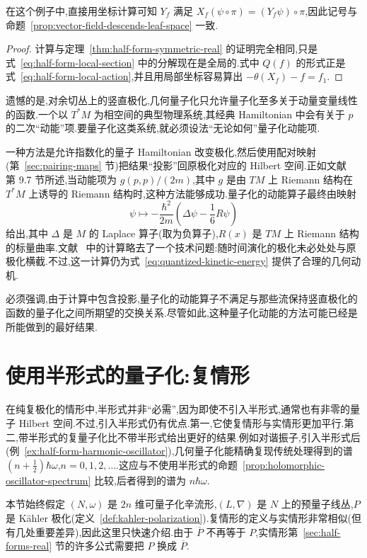 在这个例子中,直接用坐标计算可知 $Y_f$ 满足 $X_f(\psi\circ\pi)=(Y_f\psi)\circ\pi$,因此记号与命题~\ref{prop:vector-field-descends-leaf-space} 一致.

\begin{proof}
计算与定理~\ref{thm:half-form-symmetric-real} 的证明完全相同,只是式~\eqref{eq:half-form-local-section} 中的分解现在是全局的.式中 $Q(f)$ 的形式正是式~\eqref{eq:half-form-local-action},并且用局部坐标容易算出 $-\theta(X_f)-f=f_1$.
\end{proof}

遗憾的是,对余切丛上的竖直极化,几何量子化只允许量子化至多关于动量变量线性的函数.一个以 $T^*M$ 为相空间的典型物理系统,其经典 Hamiltonian 中会有关于 $p$ 的二次“动能”项.要量子化这类系统,就必须设法“无论如何”量子化动能项.

一种方法是允许指数化的量子 Hamiltonian 改变极化,然后使用配对映射(第~\ref{sec:pairing-maps} 节)把结果“投影”回原极化对应的 Hilbert 空间.正如文献~\cite{Woodhouse1992} 第 9.7 节所述,当动能项为 $g(p,p)/(2m)$,其中 $g$ 是由 $TM$ 上 Riemann 结构在 $T^*M$ 上诱导的 Riemann 结构时,这种方法能够成功.量子化的动能算子最终由映射
\[
 \psi\longmapsto-\frac{\hbar^2}{2m}
 \left(\Delta\psi-\frac16R\psi\right)
 \label{eq:quantized-kinetic-energy}
\]
给出,其中 $\Delta$ 是 $M$ 的 Laplace 算子(取为负算子),$R(x)$ 是 $TM$ 上 Riemann 结构的标量曲率.文献~\cite{Woodhouse1992} 中的计算略去了一个技术问题:随时间演化的极化未必处处与原极化横截.不过,这一计算仍为式~\eqref{eq:quantized-kinetic-energy} 提供了合理的几何动机.

必须强调,由于计算中包含投影,量子化的动能算子不满足与那些流保持竖直极化的函数的量子化之间所期望的交换关系.尽管如此,这种量子化动能的方法可能已经是所能做到的最好结果.

\section{使用半形式的量子化:复情形}
\label{sec:half-forms-complex}

在纯复极化的情形中,半形式并非“必需”,因为即使不引入半形式,通常也有非零的量子 Hilbert 空间.不过,引入半形式仍有优点.第一,它使复情形与实情形更加平行.第二,带半形式的复量子化比不带半形式给出更好的结果.例如对谐振子,引入半形式后(例~\ref{ex:half-form-harmonic-oscillator}),几何量子化能精确复现传统处理得到的谱 $(n+\tfrac12)\hbar\omega$,$n=0,1,2,\ldots$.这应与不使用半形式的命题~\ref{prop:holomorphic-oscillator-spectrum} 比较,后者得到的谱为 $n\hbar\omega$.

本节始终假定 $(N,\omega)$ 是 $2n$ 维可量子化辛流形,$(L,\nabla)$ 是 $N$ 上的预量子线丛,$P$ 是 Kähler 极化(定义~\ref{def:kahler-polarization}).复情形的定义与实情形非常相似(但有几处重要差异),因此这里只快速介绍.由于 $\overline P$ 不再等于 $P$,实情形第~\ref{sec:half-forms-real} 节的许多公式需要把 $P$ 换成 $\overline P$.

